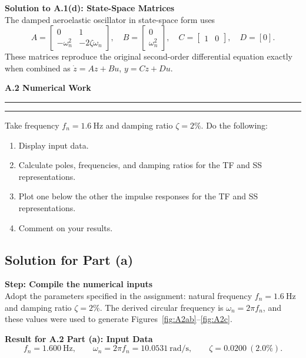 \documentclass[12pt]{article}
\newcommand{\question}[1]{%
  \clearpage
  \vspace{0.5cm}
  {\noindent\normalsize \textbf{#1}}%
  \vspace{0.2cm}
  \hrule
  \vspace{0.1cm}
  \hrule
  \vspace{0.3cm}
}
\begin{document}
\begin{resultsbox}
\textbf{Solution to A.1(d): State-Space Matrices}\\[0.5em]
The damped aeroelastic oscillator in state-space form uses
\[
A =
\begin{bmatrix}
0 & 1 \\
-\omega_n^2 & -2\zeta\omega_n
\end{bmatrix},
\quad
B =
\begin{bmatrix}
0 \\
\omega_n^2
\end{bmatrix},
\quad
C = \begin{bmatrix} 1 & 0 \end{bmatrix},
\quad
D = [0].
\]
These matrices reproduce the original second-order differential equation exactly when combined as $\dot{z} = A z + B u$, $y = C z + D u$.
\end{resultsbox}

\question{A.2 Numerical Work}\label{quest:A2}

Take frequency $f_n = 1.6~\mathrm{Hz}$ and damping ratio $\zeta = 2\%$. Do the following:
\begin{enumerate}[label=(\alph*)]
  \item Display input data.
  \item Calculate poles, frequencies, and damping ratios for the TF and SS representations.
\item Plot one below the other the impulse responses for the TF and SS representations.
\item Comment on your results.
\end{enumerate}
\subsection*{Solution for Part (a)}

\begin{stepbox}
\textbf{Step: Compile the numerical inputs}\\[0.5em]
Adopt the parameters specified in the assignment: natural frequency $f_n = 1.6~\text{Hz}$ and damping ratio $\zeta = 2\%$.  The derived circular frequency is $\omega_n = 2\pi f_n$, and these values were used to generate Figures~\ref{fig:A2ab}--\ref{fig:A2c}.
\end{stepbox}

\begin{resultsbox}
\textbf{Result for A.2 Part (a): Input Data}\\[0.5em]
\[
f_n = 1.600~\text{Hz}, \qquad \omega_n = 2\pi f_n = 10.0531~\text{rad/s}, \qquad \zeta = 0.0200~(2.0\%).
\]
\end{resultsbox}
\end{document}
